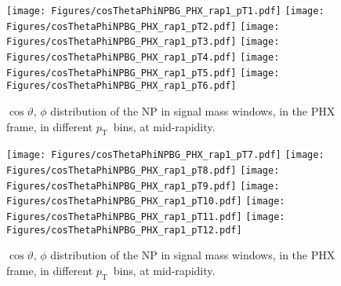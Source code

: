 \documentclass[12pt]{article}
\newcommand{\pt}{$p_{\mathrm{T}}$}
\begin{document}
%
%

\begin{figure}[htbp]
\centering
\texttt{[image: Figures/cosThetaPhiNPBG\_PHX\_rap1\_pT1.pdf]}
\texttt{[image: Figures/cosThetaPhiNPBG\_PHX\_rap1\_pT2.pdf]}
\texttt{[image: Figures/cosThetaPhiNPBG\_PHX\_rap1\_pT3.pdf]}
\texttt{[image: Figures/cosThetaPhiNPBG\_PHX\_rap1\_pT4.pdf]}
\texttt{[image: Figures/cosThetaPhiNPBG\_PHX\_rap1\_pT5.pdf]}
\texttt{[image: Figures/cosThetaPhiNPBG\_PHX\_rap1\_pT6.pdf]}
\caption{$\cos\vartheta,\,\phi$ distribution of the NP in signal mass windows, 
	in the PHX frame, in different \pt\ bins, at mid-rapidity.}
\end{figure}
\clearpage

\begin{figure}[htbp]
\centering
\texttt{[image: Figures/cosThetaPhiNPBG\_PHX\_rap1\_pT7.pdf]}
\texttt{[image: Figures/cosThetaPhiNPBG\_PHX\_rap1\_pT8.pdf]}
\texttt{[image: Figures/cosThetaPhiNPBG\_PHX\_rap1\_pT9.pdf]}
\texttt{[image: Figures/cosThetaPhiNPBG\_PHX\_rap1\_pT10.pdf]}
\texttt{[image: Figures/cosThetaPhiNPBG\_PHX\_rap1\_pT11.pdf]}
\texttt{[image: Figures/cosThetaPhiNPBG\_PHX\_rap1\_pT12.pdf]}
\caption{$\cos\vartheta,\,\phi$ distribution of the NP in signal mass windows, 
	in the PHX frame, in different \pt\ bins, at mid-rapidity.}
\end{figure}
\clearpage
\end{document}
